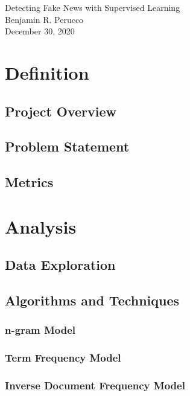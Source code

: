 \documentclass[a4paper,12pt,nottoc]{article}
\begin{document}
\begin{center}{\LARGE Detecting Fake News with Supervised Learning}\\\vspace{.5cm}Benjamin R. Perucco\\\vspace{.25cm}December 30, 2020\end{center}

\section{Definition}

\subsection{Project Overview}

\subsection{Problem Statement}

\subsection{Metrics}

\section{Analysis}

\subsection{Data Exploration}

\subsection{Algorithms and Techniques}

\subsubsection{n-gram Model}

\subsubsection{Term Frequency Model}

\subsubsection{Inverse Document Frequency Model}
\end{document}

